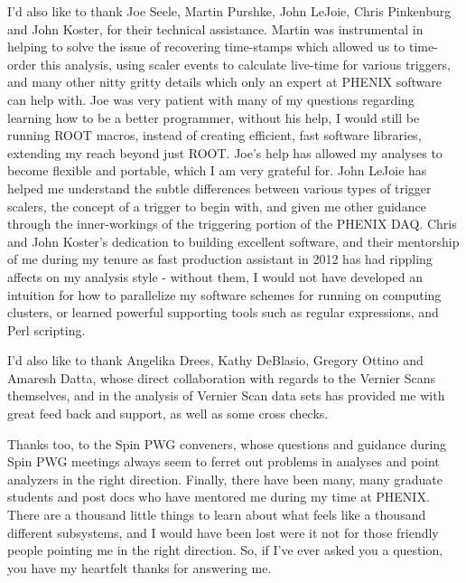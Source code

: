 I'd also like to thank Joe Seele, Martin Purshke, John LeJoie, Chris Pinkenburg and John
Koster, for their technical assistance. Martin was instrumental in helping to solve the
issue of recovering time-stamps which allowed us to time-order this analysis, using scaler
events to calculate live-time for various triggers, and many other nitty gritty details
which only an expert at PHENIX software can help with. Joe was very patient with many of
my questions regarding learning how to be a better programmer, without his help, I would
still be running ROOT macros, instead of creating efficient, fast software libraries,
extending my reach beyond just ROOT. Joe's help has allowed my analyses to become flexible
and portable, which I am very grateful for. John LeJoie has helped me understand the
subtle differences between various types of trigger scalers, the concept of a trigger to
begin with, and given me other guidance through the inner-workings of the triggering
portion of the PHENIX DAQ. Chris and John Koster's dedication to building excellent
software, and their mentorship of me during my tenure as fast production assistant in 2012
has had rippling affects on my analysis style - without them, I would not have developed
an intuition for how to parallelize my software schemes for running on computing clusters,
or learned powerful supporting tools such as regular expressions, and Perl scripting.

I'd also like to thank Angelika Drees, Kathy DeBlasio, Gregory Ottino and Amaresh
Datta, whose direct collaboration with regards to the Vernier Scans themselves, and in the
analysis of Vernier Scan data sets has provided me with great feed back and support, as
well as some cross checks.

Thanks too, to the Spin PWG conveners, whose questions and guidance during Spin PWG
meetings always seem to ferret out problems in analyses and point analyzers in the right
direction. Finally, there have been many, many graduate students and post docs who have
mentored me during my time at PHENIX. There are a thousand little things to learn about
what feels like a thousand different subsystems, and I would have been lost were it not
for those friendly people pointing me in the right direction.  So, if I've ever asked you
a question, you have my heartfelt thanks for answering me.
